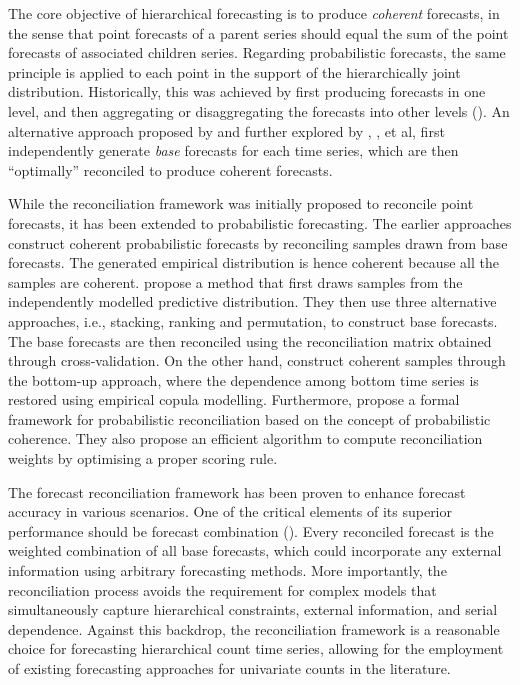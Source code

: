 \documentclass[a4paper,review,12pt,authoryear]{elsarticle}
\begin{document}
The core objective of hierarchical forecasting is to produce \textit{coherent} forecasts, 
in the sense that point forecasts of a parent series should equal the sum of the point forecasts of associated children series. 
Regarding probabilistic forecasts, the same principle is applied to each point in the support of the hierarchically joint distribution.
Historically, this was achieved by first producing forecasts in one level, 
and then aggregating or disaggregating the forecasts into other levels (\citealp{fliednerHierarchicalForecastingIssues2001}). 
An alternative approach proposed by \cite{hyndmanOptimalCombinationForecasts2011} and further explored by \cite{wickramasuriyaOptimalForecastReconciliation2019}, \cite{ anagiotelisForecastReconciliationGeometric2021}, et al, 
first independently generate \textit{base} forecasts for each time series, 
which are then ``optimally'' reconciled to produce coherent forecasts.

While the reconciliation framework was initially proposed to reconcile point forecasts, it has been extended to probabilistic forecasting. 
The earlier approaches construct coherent probabilistic forecasts by reconciling samples drawn from base forecasts. 
The generated empirical distribution is hence coherent because all the samples are coherent.
\cite{jeonProbabilisticForecastReconciliation2019} propose a method that first draws samples from the independently modelled predictive distribution. 
They then use three alternative approaches, i.e., stacking, ranking and permutation, to construct base forecasts. 
The base forecasts are then reconciled using the reconciliation matrix obtained through cross-validation. 
On the other hand, \cite{bentaiebHierarchicalProbabilisticForecasting2020} construct coherent samples through the bottom-up approach, 
where the dependence among bottom time series is restored using empirical copula modelling.
Furthermore, \cite{panagiotelisProbabilisticForecastReconciliation2022} propose a formal framework for probabilistic reconciliation based on the concept of probabilistic coherence. 
They also propose an efficient algorithm to compute reconciliation weights by optimising a proper scoring rule. 

The forecast reconciliation framework has been proven to enhance forecast accuracy in various scenarios. 
One of the critical elements of its superior performance should be forecast combination (\citealp{hollymanUnderstandingForecastReconciliation2021}). 
Every reconciled forecast is the weighted combination of all base forecasts,
which could incorporate any external information using arbitrary forecasting methods.
More importantly, the reconciliation process avoids the requirement for complex models that simultaneously capture hierarchical constraints, external information, and serial dependence.
Against this backdrop, the reconciliation framework is a reasonable choice for forecasting hierarchical count time series,
allowing for the employment of existing forecasting approaches for univariate counts in the literature.
\end{document}
